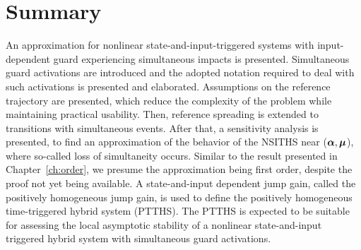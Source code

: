 \documentclass[../DC2019003Bouma.tex]{subfiles}
\begin{document}
\section{Summary}
An approximation for nonlinear state-and-input-triggered systems with input-dependent guard experiencing simultaneous impacts is presented. Simultaneous guard activations are introduced and the adopted notation required to deal with such activations is presented and elaborated. Assumptions on the reference trajectory are presented, which reduce the complexity of the problem while maintaining practical usability. Then, reference spreading is extended to transitions with simultaneous events. After that, a sensitivity analysis is presented, to find an approximation of the behavior of the NSITHS near ($\boldsymbol{\alpha},\boldsymbol{\mu}$), where so-called loss of simultaneity occurs. Similar to the result presented in Chapter~\ref{ch:order}, we presume the approximation being first order, despite the proof not yet being available. A state-and-input dependent jump gain, called the positively homogeneous jump gain, is used to define the positively homogeneous time-triggered hybrid system (PTTHS). The PTTHS is expected to be suitable for assessing the local asymptotic stability of a nonlinear state-and-input triggered hybrid system with simultaneous guard activations.
\end{document}
